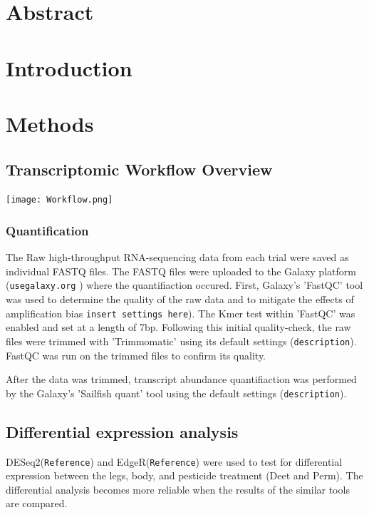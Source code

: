 \documentclass[11pt]{article}
\author{David Lewis}
\date{\today}
\title{}
\begin{document}
\tableofcontents

\section{Abstract}
\label{sec:org2436a26}
\section{Introduction}
\label{sec:orgdb000b1}
\section{Methods}
\label{sec:org3555088}
\subsection{Transcriptomic Workflow Overview}
\label{sec:orgf99f715}
\begin{center}
\texttt{[image: Workflow.png]}
\end{center}
\subsubsection{Quantification}
\label{sec:org83bca1e}
The Raw high-throughput RNA-sequencing data from each trial were saved as individual FASTQ files.
The FASTQ files were uploaded to the Galaxy platform (\texttt{usegalaxy.org} ) where the quantifiaction occured.
First, Galaxy's 'FastQC' tool was used to determine the quality of the raw data and to mitigate the effects of amplification bias \texttt{insert settings here}). The Kmer test within 'FastQC' was enabled and set at a length of 7bp.
Following this initial quality-check, the raw files were trimmed with 'Trimmomatic' using its default settings (\texttt{description}).
FastQC was run on the trimmed files to confirm its quality.

After the data was trimmed, transcript abundance quantifiaction was performed by the Galaxy's 'Sailfish quant' tool using the default settings (\texttt{description}).
\subsection{Differential expression analysis}
\label{sec:org8f25798}
DESeq2(\texttt{Reference}) and EdgeR(\texttt{Reference}) were used to test for differential expression between the legs, body, and pesticide treatment (Deet and Perm).
The differential analysis becomes more reliable when the results of the similar tools are compared.
\end{document}
